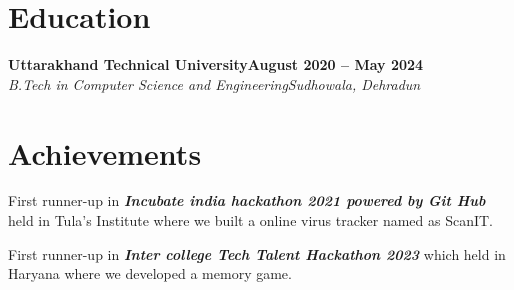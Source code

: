 \documentclass[letterpaper,10pt]{article}
\newcommand{\heading}[2]{
  \hspace{10pt}#1\hfill#2\\
}
\newcommand{\headingBf}[2]{
  \heading{\textbf{#1}}{\textbf{#2}}
}
\newcommand{\headingIt}[2]{
  \heading{\textit{#1}}{\textit{#2}}
}
\newenvironment{resume_list}{
  \vspace{-7pt}
  \begin{itemize}[itemsep=-2px, parsep=1pt, leftmargin=30pt]
}{
  \end{itemize}
}
\begin{document}

  \section{Education}

  \headingBf{Uttarakhand Technical University}{August 2020 -- May 2024}
  \headingIt{B.Tech in Computer Science and Engineering}{Sudhowala, Dehradun}


  \section{Achievements}

  \begin{resume_list}
  \vspace{5pt}
    \item First runner-up in \textbf{\textit{Incubate india hackathon 2021 powered by Git Hub}} held in Tula’s Institute where we built a online virus tracker named as ScanIT.
    \item First runner-up in \textbf{\textit{Inter college Tech Talent Hackathon 2023}} which held in Haryana where we developed a memory game.
  \end{resume_list}
\end{document}
